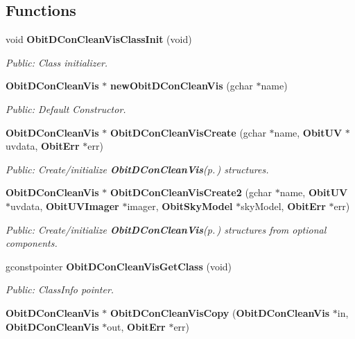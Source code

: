 \subsection*{Functions}
\begin{CompactItemize}
\item 
void {\bf Obit\-DCon\-Clean\-Vis\-Class\-Init} (void)
\begin{CompactList}\small\item\em Public: Class initializer. \item\end{CompactList}\item 
{\bf Obit\-DCon\-Clean\-Vis} $\ast$ {\bf new\-Obit\-DCon\-Clean\-Vis} (gchar $\ast$name)
\begin{CompactList}\small\item\em Public: Default Constructor. \item\end{CompactList}\item 
{\bf Obit\-DCon\-Clean\-Vis} $\ast$ {\bf Obit\-DCon\-Clean\-Vis\-Create} (gchar $\ast$name, {\bf Obit\-UV} $\ast$uvdata, {\bf Obit\-Err} $\ast$err)
\begin{CompactList}\small\item\em Public: Create/initialize {\bf Obit\-DCon\-Clean\-Vis}{\rm (p.\,\pageref{structObitDConCleanVis})} structures. \item\end{CompactList}\item 
{\bf Obit\-DCon\-Clean\-Vis} $\ast$ {\bf Obit\-DCon\-Clean\-Vis\-Create2} (gchar $\ast$name, {\bf Obit\-UV} $\ast$uvdata, {\bf Obit\-UVImager} $\ast$imager, {\bf Obit\-Sky\-Model} $\ast$sky\-Model, {\bf Obit\-Err} $\ast$err)
\begin{CompactList}\small\item\em Public: Create/initialize {\bf Obit\-DCon\-Clean\-Vis}{\rm (p.\,\pageref{structObitDConCleanVis})} structures from optional components. \item\end{CompactList}\item 
gconstpointer {\bf Obit\-DCon\-Clean\-Vis\-Get\-Class} (void)
\begin{CompactList}\small\item\em Public: Class\-Info pointer. \item\end{CompactList}\item 
{\bf Obit\-DCon\-Clean\-Vis} $\ast$ {\bf Obit\-DCon\-Clean\-Vis\-Copy} ({\bf Obit\-DCon\-Clean\-Vis} $\ast$in, {\bf Obit\-DCon\-Clean\-Vis} $\ast$out, {\bf Obit\-Err} $\ast$err)

\end{CompactItemize}
